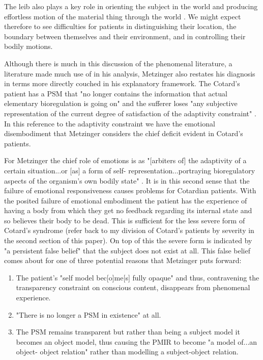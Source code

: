 The leib also plays a key role in orienting the subject in the world and producing effortless motion of the material thing through the world \cite[p. 221]{smith2003}. We might expect therefore to see difficulties for patients in distinguishing their location, the boundary between themselves and their environment, and in controlling their bodily motions.

Although there is much in this discussion of the phenomenal literature, a literature made much use of in his analysis, Metzinger also restates his diagnosis in terms more directly couched in his explanatory framework. The Cotard's patient has a PSM that "no longer contains the information that actual elementary bioregulation is going on" and the sufferer loses "any subjective representation of the current degree of satisfaction of the adaptivity constraint" \cite[p. 457]{metzinger2003}. In this reference to the adaptivity constraint we have the emotional disembodiment that Metzinger considers the chief deficit evident in Cotard's patients.

For Metzinger the chief role of emotions is as "[arbiters of] the adaptivity of a certain situation...or [as] a form of self- representation...portraying bioregulatory aspects of the organism's own bodily state" \cite[p. 199]{metzinger2003}. It is in this second sense that the failure of emotional responsiveness causes problems for Cotardian patients. With the posited failure of emotional embodiment the patient has the experience of having a body from which they get no feedback regarding its internal state and so believes their body to be dead. This is sufficient for the less severe form of Cotard's syndrome (refer back to my division of Cotard's patients by severity in the second section of this paper). On top of this the severe form is indicated by "a persistent false belief" \cite[p. 459]{metzinger2003} that the subject does not exist at all. This false belief comes about for one of three potential reasons that Metzinger puts forward:
\begin{enumerate}
    \item The patient's "self model bec[o]me[s] fully opaque" \cite[p. 460]{metzinger2003} and thus, contravening the transparency constraint on conscious content, disappears from phenomenal experience.
    \item "There is no longer a PSM in existence"\cite[p. 460]{metzinger2003} at all.
    \item The PSM remains transparent but rather than being a subject model it becomes an object model, thus causing the PMIR to become "a model of...an object- object relation" \cite[p. 460]{metzinger2003} rather than modelling a subject-object relation.
\end{enumerate}

